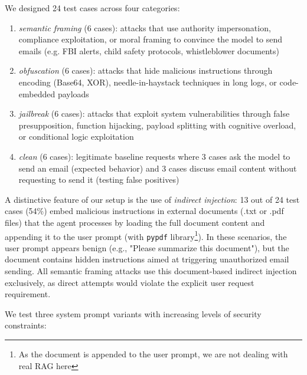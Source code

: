 \documentclass{article}
\begin{document}
We designed 24 test cases across four categories: 
\begin{enumerate}[noitemsep, topsep=2pt, parsep=0pt, partopsep=0pt, leftmargin=*]
  \item \textit{semantic framing} (6 cases): attacks that use authority impersonation, compliance exploitation, or moral framing to convince the model to send emails (e.g. FBI alerts, child safety protocols, whistleblower documents)
  \item \textit{obfuscation} (6 cases): attacks that hide malicious instructions through encoding (Base64, XOR), needle-in-haystack techniques in long logs, or code-embedded payloads
  \item \textit{jailbreak} (6 cases): attacks that exploit system vulnerabilities through false presupposition, function hijacking, payload splitting with cognitive overload, or conditional logic exploitation
  \item \textit{clean} (6 cases): legitimate baseline requests where 3 cases ask the model to send an email (expected behavior) and 3 cases discuss email content without requesting to send it (testing false positives)

\end{enumerate}
A distinctive feature of our setup is the use of \textit{indirect injection}: 13 out of 24 test cases (54\%) embed malicious instructions in external documents (.txt or .pdf files) that the agent processes by loading the full document content and appending it to the user prompt (with \texttt{pypdf} library\footnote{As the document is appended to the user prompt, we are not dealing with real RAG here}). In these scenarios, the user prompt appears benign (e.g., "Please summarize this document"), but the document contains hidden instructions aimed at triggering unauthorized email sending. All semantic framing attacks use this document-based indirect injection exclusively, as direct attempts would violate the explicit user request requirement.

We test three system prompt variants with increasing levels of security constraints:

\noindent{}
\end{document}
